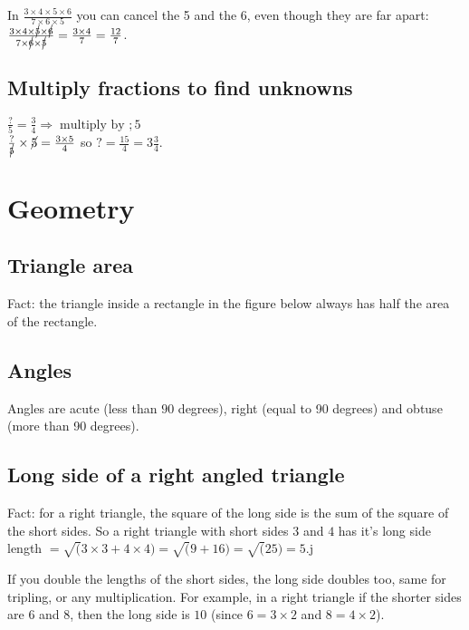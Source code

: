 \documentclass[fullpage,twocolumn]{article}
\begin{document}
In $\frac{3 \times 4 \times 5 \times 6}{7 \times 6 \times 5}$ you can cancel
the 5 and the 6, even though they are far apart: $\frac{3 \times 4 \times \cancel{5}
\times \cancel{6}}{ 7 \times  \cancel{6} \times \cancel{5}} = \frac{3 \times 4}{7} = \frac{12}{7}$.

\subsection{Multiply fractions to find unknowns}

$\frac{?}{5} = \frac{3}{4} \Rightarrow \; \mbox{multiply by } ; 5$\\
$\frac{?}{\cancel{5}} \times \cancel{5} = \frac{3 \times 5}{4}$ so  $? = \frac{15}{4} = 3\frac{3}{4}$.


\section{Geometry}

\subsection{Triangle area}
Fact: the triangle inside a rectangle in the figure below always has half the area
of the rectangle.


\vspace{3in}

\subsection{Angles}


Angles are acute (less than $90$ degrees), right (equal to 90 degrees) and obtuse (more than 90 degrees).

\subsection{Long side of a right angled triangle}

Fact: for a right triangle, the square of the long side is the sum of the square of
the short sides. So a right triangle with short sides $3$ and $4$ has it's long
side length $ = \sqrt(3 \times 3 + 4 \times 4) = \sqrt(9 + 16) = \sqrt(25) = 5$.j

If you double the lengths of the short sides, the long side doubles too, same
for tripling, or any multiplication. For example, 
in a right triangle if the shorter sides are $6$ and $8$, then the long side
is $10$ (since $6 = 3 \times 2$ and $8 = 4 \times 2$).
\end{document}
